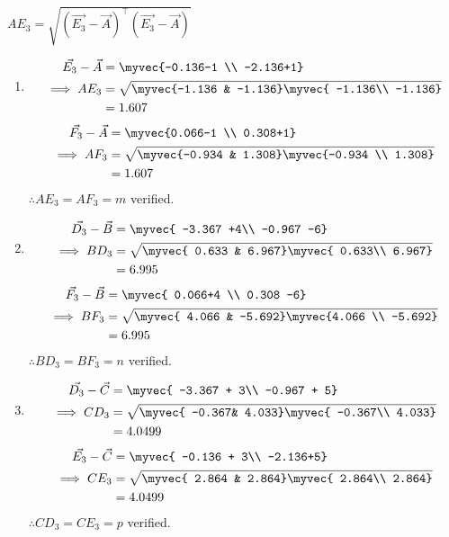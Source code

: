 \documentclass[journal,12pt,twocolumn]{IEEEtran}
\theoremstyle{remark}
\begin{document}
${AE_3}=\sqrt{{(\vec{E_3}-\vec A)}^{\top}{(\vec{E_3}-\vec A)}}$
\begin{enumerate}
	\item \begin{align}
	\vec{E_3}-\vec A&=\myvec{-0.136-1 \\ 
       -2.136+1}\\
\implies	{AE_3}&=\sqrt{\myvec{-1.136 &
       -1.136}
       \myvec{ -1.136\\ 
       -1.136}} \\
	&= 1.607 
\end{align}
 \begin{align} 
	\vec{F_3}-\vec A&=\myvec{0.066-1 \\ 
       0.308+1}\\
\implies	{AF_3}&=\sqrt{\myvec{-0.934 &
       1.308}
	\myvec{-0.934 \\ 
       1.308}} \\
	&=1.607
\end{align}
$\therefore{AE_3}= {AF_3}=m$ verified.
\item \begin{align}
 	\vec{D_3}-\vec B&=\myvec{ -3.367 +4\\ 
                -0.967 -6}\\
\implies	{BD_3}&=\sqrt{\myvec{ 0.633  &
       6.967}
       \myvec{ 0.633\\ 
       6.967}} \\
	&=6.995 
\end{align}
\begin{align}
	\vec{F_3}-\vec B&=\myvec{ 0.066+4 \\
         0.308 -6}\\                              
\implies	{BF_3}&=\sqrt{\myvec{ 4.066 &
       -5.692}
       \myvec{4.066 \\ 
       -5.692}} \\
	&=6.995 
\end{align}
$\therefore {BD_3}= {BF_3}=n$ verified.
\item \begin{align}
	\vec{D_3}-\vec C&=\myvec{ -3.367 + 3\\
       -0.967 + 5}\\
\implies	{CD_3}&=\sqrt{\myvec{ -0.367&
       4.033}
       \myvec{ -0.367\\
       4.033}} \\
	&=4.0499 
\end{align}           
\begin{align}
	\vec{E_3}-\vec C&=\myvec{ -0.136 + 3\\ 
       -2.136+5}\\
\implies	{CE_3}&=\sqrt{\myvec{ 2.864 &
       2.864}
       \myvec{ 2.864\\ 
       2.864}}\\
	&= 4.0499            
\end{align}
$\therefore {CD_3}= {CE_3}=p$ verified.
\end{enumerate}
\end{document}

